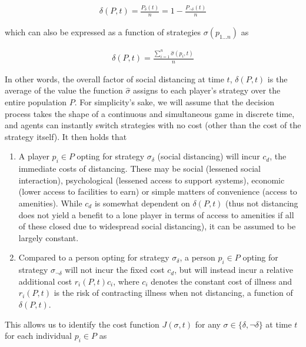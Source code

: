 \documentclass[12pt]{article}
\begin{document}
\begin{equation}
	\begin{aligned}
		\delta(P, t) = \frac{P_{\delta}(t)}{n} = 1 - \frac{P_{\lnot \delta}(t)}{n}
	\end{aligned}
\end{equation}

\noindent which can also be expressed as a function of strategies $\sigma(p_{1 \ldots n})$ as

\begin{equation}
	\begin{aligned}
		\delta(P, t) = \frac{\sum_{i=1}^n \hat{\sigma}(p_i, t)}{n}
	\end{aligned}
	\label{eq:delta_value}
\end{equation}

In other words, the overall factor of social distancing at time $t$, $\delta(P, t)$ is the average of the value the function $\hat{\sigma}$ assigns to each player's strategy over the entire population $P$. For simplicity's sake, we will assume that the decision process takes the shape of a continuous and simultaneous game in discrete time, and agents can instantly switch strategies with no cost (other than the cost of the strategy itself). It then holds that

\begin{enumerate}
	\item A player $p_i \in P$ opting for strategy $\sigma_{\delta}$ (social distancing) will incur $c_d$, the immediate costs of distancing. These may be social (lessened social interaction), psychological (lessened access to support systems), economic (lower access to facilities to earn) or simple matters of convenience (access to amenities). While $c_d$ is somewhat dependent on $\delta(P, t)$ (thus not distancing does not yield a benefit to a lone player in terms of access to amenities if all of these closed due to widespread social distancing), it can be assumed to be largely constant.
	\item Compared to a person opting for strategy $\sigma_{\delta}$, a person $p_i \in P$ opting for strategy $\sigma_{\lnot \delta}$ will not incur the fixed cost $c_d$, but will instead incur a relative additional cost $r_i(P, t) c_i$, where $c_i$ denotes the constant cost of illness and $r_i(P, t)$ is the risk of contracting illness when not distancing, a function of $\delta(P, t)$.
\end{enumerate}

This allows us to identify the cost function $J(\sigma, t)$ for any $\sigma \in \{\delta, \lnot \delta\}$ at time $t$ for each individual $p_i \in P$ as
\end{document}
